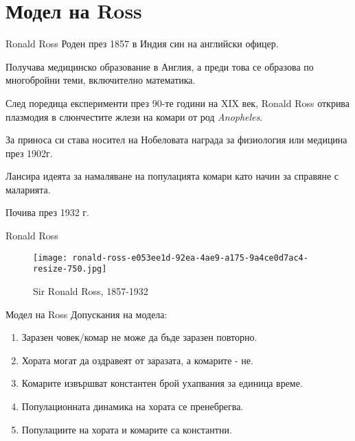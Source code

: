 \section{\hspace{1em}Модел на Ross}
\begin{frame}[t]{Ronald Ross}
  Роден през 1857 в Индия син на английски офицер.

  Получава медицинско образование в Англия, а преди това се образова по многобройни теми, включително математика.

  След поредица експерименти през 90-те години на XIX век, Ronald Ross открива плазмодия в слюнчестите жлези на комари от род \textit{Anopheles}.

  За приноса си става носител на Нобеловата награда за физиология или медицина през 1902г.

  Лансира идеята за намаляване на популацията комари като начин за справяне с маларията.

  Почива през 1932 г.
\end{frame}

\begin{frame}[t]{Ronald Ross}
  \begin{figure}
    \texttt{[image: ronald-ross-e053ee1d-92ea-4ae9-a175-9a4ce0d7ac4-resize-750.jpg]}
    \centering
    \caption{Sir Ronald Ross, 1857-1932}
  \end{figure}
\end{frame}

\begin{frame}[t]{Модел на Ross}
  Допускания на модела:
  \begin{enumerate}
    \item Заразен човек/комар не може да бъде заразен повторно.
    \item Хората могат да оздравеят от заразата, а комарите - не.
    \item Комарите извършват константен брой ухапвания за единица време.
    \item Популационната динамика на хората се пренебрегва.
    \item Популациите на хората и комарите са константни.
  \end{enumerate}
\end{frame}

